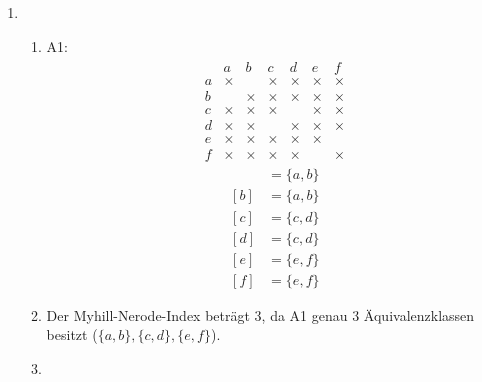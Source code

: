 \begin{enumerate}[1.]
  \item
    \begin{enumerate}
      \item A1:
        \begin{align*}
          \begin{matrix}
            & a & b & c & d & e & f\\
            a & \times & & \times & \times & \times & \times\\
            b & & \times & \times & \times & \times & \times\\
            c & \times & \times & \times & & \times & \times\\
            d & \times & \times & & \times & \times & \times\\
            e & \times & \times & \times & \times & \times & \\
            f & \times & \times & \times & \times & & \times
          \end{matrix}
        \end{align*}
        \begin{align*}
          [a] & = \{ a, b \}\\
          [b] & = \{ a, b \}\\
          [c] & = \{ c, d \}\\
          [d] & = \{ c, d \}\\
          [e] & = \{ e, f \}\\
          [f] & = \{ e, f \}
        \end{align*}

      \item Der Myhill-Nerode-Index beträgt $3$, da A1 genau $3$
        Äquivalenzklassen besitzt ($\{a,b\}, \{c,d\}, \{e,f\}$).

      \item \
        \begin{center}
        \end{center}


\end{enumerate}
\end{enumerate}
